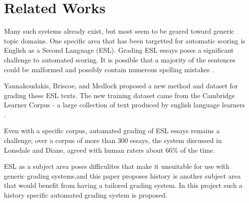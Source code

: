 \section{Related Works}
\label{section:motivation}
Many such systems already exist, but most seem to be geared toward generic topic domains. One specific area that has been targetted for automatic scoring is English as a Second Language (ESL). Grading ESL essays poses a significant challenge to automated scoring. It is possible that a majority of the sentences could be malformed and possibly contain numerous spelling mistakes \cite{ESOL2}.

Yannakoudakis, Briscoe, and Medlock proposed a new method and dataset for grading these ESL texts. The new training dataset came from the Cambridge Learner Corpus - a large collection of text produced by english language learners \cite{ESOL}. 

Even with a specific corpus, automated grading of ESL essays remains a challenge; over a corpus of more than 300 essays, the system discussed in Lonsdale and Diane, \cite{ESOL2} agreed with human raters about 66\% of the time.\  

ESL as a subject area poses difficulites that make it unsuitable for use with generic grading systems,and this paper proposes history is another subject area that would benefit from having a tailored grading system. In this project such a history specific automated grading system is proposed.
